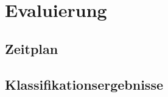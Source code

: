 \section{Evaluierung}

\subsection{Zeitplan}

\subsection{Klassifikationsergebnisse}

\newpage %



\newpage %




